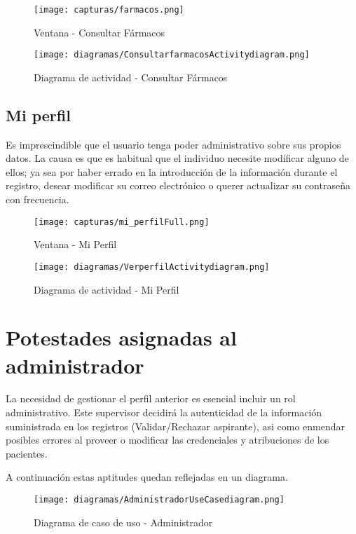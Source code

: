 \documentclass[11pt,spanish,
		listoftables,listoffigures]
		{tfgplantilla}
\begin{document}
\begin{figure}[H]
\centering
\texttt{[image: capturas/farmacos.png]}
\caption{Ventana - Consultar Fármacos}
\end{figure}

\begin{figure}[H]
\centering
\texttt{[image: diagramas/ConsultarfarmacosActivitydiagram.png]}
\caption{Diagrama de actividad -  Consultar Fármacos}
\end{figure}

\subsection {Mi perfil}

Es imprescindible que el usuario tenga poder administrativo sobre sus propios datos. La causa es que es habitual que el individuo necesite modificar alguno de ellos; ya sea por haber errado en la introducción de la información durante el registro, desear modificar su correo electrónico o querer actualizar su contraseña con frecuencia.

\begin{figure}[H]
\centering
\texttt{[image: capturas/mi\_perfilFull.png]}
\caption{Ventana - Mi Perfil}
\end{figure}

\begin{figure}[H]
\centering
\texttt{[image: diagramas/VerperfilActivitydiagram.png]}
\caption{Diagrama de actividad -  Mi Perfil}
\end{figure}

\section {Potestades asignadas al administrador}
La necesidad de gestionar el perfil anterior es esencial incluir un rol administrativo. Este supervisor decidirá la autenticidad de la información suministrada en los registros (Validar/Rechazar aspirante), asi como enmendar posibles errores al proveer o modificar las credenciales y atribuciones de los pacientes.

A continuación estas aptitudes quedan reflejadas en un diagrama.

\begin{figure}[H]
\centering
\texttt{[image: diagramas/AdministradorUseCasediagram.png]}
\caption{Diagrama de caso de uso - Administrador}
\end{figure}
\end{document}
